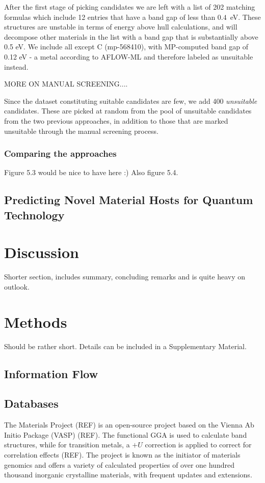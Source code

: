 \documentclass[superscriptaddress,unsortedaddress,
 amsmath,amssymb,
 aps,
]{revtex4-2}
\begin{document}
After the first stage of picking candidates we are left with a list of 202 matching formulas which include 12 entries that have a band gap of less than $0.4$~eV. These structures are unstable in terms of energy above hull calculations, and will decompose other materials in the list with a band gap that is substantially above 0.5 eV. We include all except C (mp-568410),
with MP-computed band gap of 0.12 eV - a metal according to AFLOW-ML and therefore 
labeled as unsuitable instead.

MORE ON MANUAL SCREENING....

Since the dataset constituting suitable candidates are few, we add 400 \emph{unsuitable}
candidates. These are picked at random from the pool of unsuitable candidates 
from the two previous approaches, in addition to those that are marked unsuitable through
the manual screening process.

\subsubsection*{Comparing the approaches}

Figure 5.3 would be nice to have here :) Also figure 5.4.


\subsection*{Predicting Novel Material Hosts for Quantum Technology} %

\section*{Discussion} %
Shorter section, includes summary, concluding remarks and is quite heavy on outlook.  

\section*{Methods}
Should be rather short. Details can be included in a Supplementary Material. 

\subsection*{Information Flow}

\subsection*{Databases} %
The Materials Project (REF) is an open-source project based on the Vienna Ab Initio Package (VASP) (REF). The functional GGA is used to calculate band structures, while for transition metals, a $+U$ correction is applied to correct for correlation effects (REF). The project is known as the initiator of materials genomics and offers a variety of calculated properties of over one hundred thousand inorganic crystalline materials, with frequent updates and extensions. 
\end{document}
